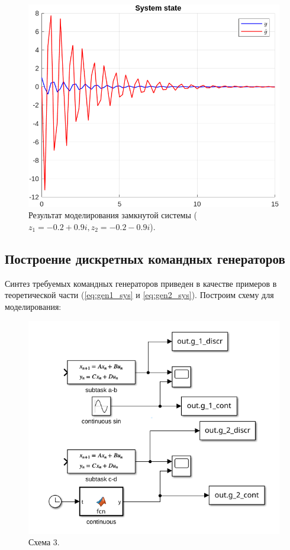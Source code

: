 \documentclass[a4paper, 14pt]{extarticle}
\theoremstyle{definition}
\theoremstyle{plain}
\theoremstyle{remark}
\begin{document}
\begin{figure}
    [H]
    \centering
    \includegraphics[width=350pt]{images/task2_d__5_state.png}
    \caption{Результат моделирования замкнутой системы ($z_1=-0.2+0.9i, z_2=-0.2-0.9i$).}
\end{figure}

\subsection{Построение дискретных командных генераторов}
Синтез требуемых командных генераторов приведен в качестве примеров в теоретической части (\ref{eq:gen1_sys} и \ref{eq:gen2_sys}). Построим схему для моделирования:
\begin{figure}
    [H]
    \centering
    \includegraphics[width=350pt]{images/scheme_3.png}
    \caption{Схема 3.}
\end{figure}
\end{document}
